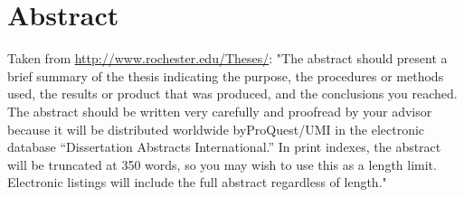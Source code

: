 \documentclass[\main/master.tex]{subfiles}
\begin{document}
\chapter*{Abstract}
\hspace{5 mm} Taken from \url{http://www.rochester.edu/Theses/}: "The abstract should present a brief summary of the thesis indicating the purpose, the procedures or methods used, the results or product that was produced, and the conclusions you reached. The abstract should be written very carefully and proofread by your advisor because it will be distributed worldwide byProQuest\textsuperscript{\tiny\textregistered}/UMI in the electronic database “Dissertation Abstracts International.” In print indexes, the abstract will be truncated at 350 words, so you may wish to use this as a length limit. Electronic listings will include the full abstract regardless of length."
\end{document}
